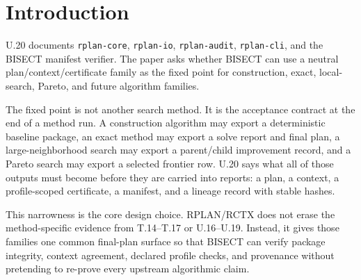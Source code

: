 \section{Introduction}

U.20 documents \texttt{rplan-core}, \texttt{rplan-io}, \texttt{rplan-audit},
\texttt{rplan-cli}, and the BISECT manifest verifier. The paper asks whether
BISECT can use a neutral plan/context/certificate family as the fixed point for
construction, exact, local-search, Pareto, and future algorithm families.

The fixed point is not another search method. It is the acceptance contract at
the end of a method run. A construction algorithm may export a deterministic
baseline package, an exact method may export a solve report and final plan, a
large-neighborhood search may export a parent/child improvement record, and a
Pareto search may export a selected frontier row. U.20 says what all of those
outputs must become before they are carried into reports: a plan, a context, a
profile-scoped certificate, a manifest, and a lineage record with stable hashes.

This narrowness is the core design choice. RPLAN/RCTX does not erase the
method-specific evidence from T.14--T.17 or U.16--U.19. Instead, it gives those
families one common final-plan surface so that BISECT can verify package
integrity, context agreement, declared profile checks, and provenance without
pretending to re-prove every upstream algorithmic claim.
